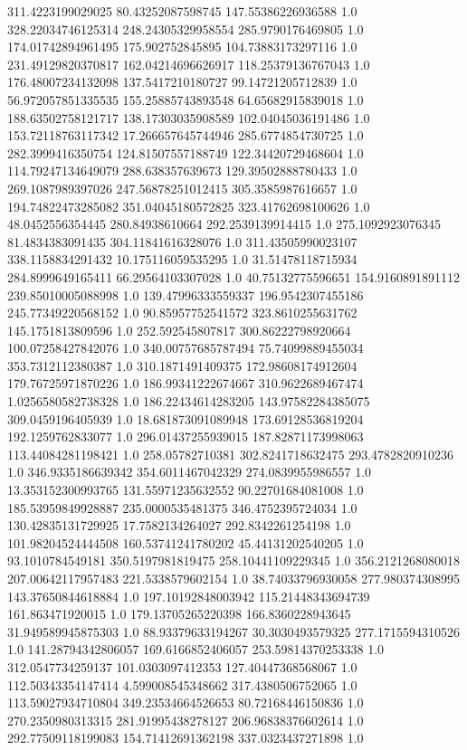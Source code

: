 311.4223199029025	80.43252087598745	147.55386226936588	1.0
328.22034746125314	248.24305329958554	285.9790176469805	1.0
174.01742894961495	175.902752845895	104.73883173297116	1.0
231.49129820370817	162.04214696626917	118.25379136767043	1.0
176.48007234132098	137.5417210180727	99.14721205712839	1.0
56.972057851335535	155.25885743893548	64.65682915839018	1.0
188.63502758121717	138.17303035908589	102.04045036191486	1.0
153.72118763117342	17.266657645744946	285.6774854730725	1.0
282.3999416350754	124.81507557188749	122.34420729468604	1.0
114.79247134649079	288.638357639673	129.39502888780433	1.0
269.1087989397026	247.56878251012415	305.3585987616657	1.0
194.74822473285082	351.04045180572825	323.41762698100626	1.0
48.0452556354445	280.84938610664	292.2539139914415	1.0
275.1092923076345	81.4834383091435	304.11841616328076	1.0
311.43505990023107	338.1158834291432	10.175116059535295	1.0
31.51478118715934	284.8999649165411	66.29564103307028	1.0
40.75132775596651	154.9160891891112	239.85010005088998	1.0
139.47996333559337	196.9542307455186	245.77349220568152	1.0
90.85957752541572	323.8610255631762	145.1751813809596	1.0
252.592545807817	300.86222798920664	100.07258427842076	1.0
340.00757685787494	75.74099889455034	353.7312112380387	1.0
310.1871491409375	172.98608174912604	179.76725971870226	1.0
186.99341222674667	310.9622689467474	1.0256580582738328	1.0
186.22434614283205	143.97582284385075	309.0459196405939	1.0
18.681873091089948	173.69128536819204	192.1259762833077	1.0
296.01437255939015	187.82871173998063	113.44084281198421	1.0
258.05782710381	302.8241718632475	293.4782820910236	1.0
346.9335186639342	354.6011467042329	274.0839955986557	1.0
13.353152300993765	131.55971235632552	90.22701684081008	1.0
185.53959849928887	235.0000535481375	346.4752395724034	1.0
130.42835131729925	17.7582134264027	292.8342261254198	1.0
101.98204524444508	160.53741241780202	45.44131202540205	1.0
93.1010784549181	350.5197981819475	258.10441109229345	1.0
356.2121268080018	207.00642117957483	221.5338579602154	1.0
38.74033796930058	277.980374308995	143.37650844618884	1.0
197.10192848003942	115.21448343694739	161.863471920015	1.0
179.13705265220398	166.8360228943645	31.949589945875303	1.0
88.93379633194267	30.3030493579325	277.1715594310526	1.0
141.28794342806057	169.6166852406057	253.59814370253338	1.0
312.0547734259137	101.0303097412353	127.40447368568067	1.0
112.50343354147414	4.599008545348662	317.4380506752065	1.0
113.59027934710804	349.23534664526653	80.72168446150836	1.0
270.2350980313315	281.91995438278127	206.96838376602614	1.0
292.77509118199083	154.71412691362198	337.0323437271898	1.0
